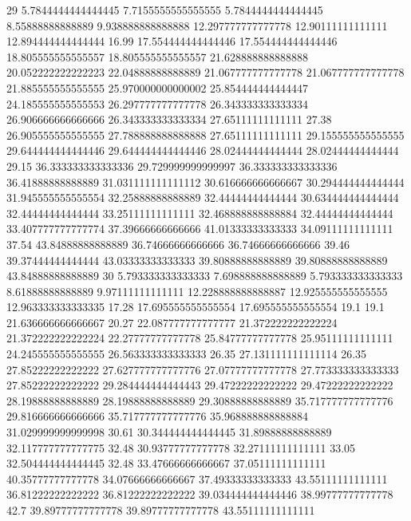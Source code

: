 29 5.7844444444444445 7.7155555555555555 5.7844444444444445 8.55888888888889 9.938888888888888 12.297777777777778 12.90111111111111 12.894444444444444 16.99 17.554444444444446 17.554444444444446 18.805555555555557 18.805555555555557 21.628888888888888 20.052222222222223 22.04888888888889 21.067777777777778 21.067777777777778 21.885555555555555 25.970000000000002 25.854444444444447 24.185555555555553 26.297777777777778 26.343333333333334 26.906666666666666 26.343333333333334 27.65111111111111 27.38 26.905555555555555 27.788888888888888 27.65111111111111 29.155555555555555 29.644444444444446 29.644444444444446 28.02444444444444 28.02444444444444 29.15 36.333333333333336 29.729999999999997 36.333333333333336 36.41888888888889 31.031111111111112 30.616666666666667 30.294444444444444 31.945555555555554 32.25888888888889 32.44444444444444 30.634444444444444 32.44444444444444 33.25111111111111 32.468888888888884 32.44444444444444 33.407777777777774 37.39666666666666 41.01333333333333 34.09111111111111 37.54 43.84888888888889 36.74666666666666 36.74666666666666 39.46 39.37444444444444 43.03333333333333 39.80888888888889 39.80888888888889 43.84888888888889
30 5.793333333333333 7.698888888888889 5.793333333333333 8.61888888888889 9.97111111111111 12.228888888888887 12.925555555555555 12.963333333333335 17.28 17.695555555555554 17.695555555555554 19.1 19.1 21.636666666666667 20.27 22.087777777777777 21.372222222222224 21.372222222222224 22.27777777777778 25.84777777777778 25.95111111111111 24.245555555555555 26.563333333333333 26.35 27.131111111111114 26.35 27.85222222222222 27.627777777777776 27.07777777777778 27.773333333333333 27.85222222222222 29.284444444444443 29.47222222222222 29.47222222222222 28.19888888888889 28.19888888888889 29.30888888888889 35.717777777777776 29.816666666666666 35.717777777777776 35.968888888888884 31.029999999999998 30.61 30.344444444444445 31.89888888888889 32.117777777777775 32.48 30.93777777777778 32.27111111111111 33.05 32.504444444444445 32.48 33.47666666666667 37.05111111111111 40.35777777777778 34.07666666666667 37.49333333333333 43.55111111111111 36.81222222222222 36.81222222222222 39.034444444444446 38.99777777777778 42.7 39.89777777777778 39.89777777777778 43.55111111111111
